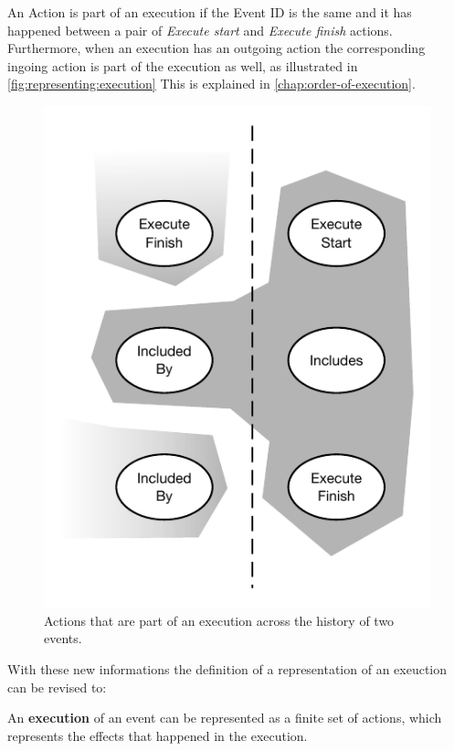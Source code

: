     \newpar
    An Action is part of an execution if the Event ID is the same and it has happened between a pair of \textit{Execute start} and \textit{Execute finish} actions. Furthermore, when an execution has an outgoing action the corresponding ingoing action is part of the execution as well, as illustrated in \autoref{fig:representing:execution} This is explained in \autoref{chap:order-of-execution}.
    
    \begin{figure}[H]
		\centering
		\includegraphics[height=0.35\textheight]{3local/images/execution.pdf}
		\caption{Actions that are part of an execution across the history of two events.}
		\label{fig:representing:execution}
	\end{figure}
    
	With these new informations the definition of a representation of an exeuction can be revised to:
	
	\begin{definition}
		An \textbf{execution} of an event can be represented as a finite set of actions, which represents the effects that happened in the execution.
	\end{definition}
	
